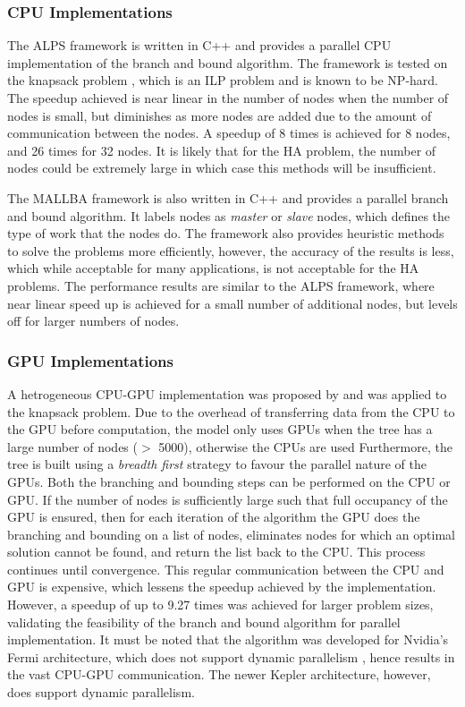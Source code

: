\documentclass[10pt,twocolumn]{witseiepaper}
\begin{document}
\subsubsection{ CPU Implementations } \label{ssec:cpuimp}

The ALPS framework \cite{xu:2005} is written in C++ and provides a parallel CPU implementation of the branch
and bound algorithm. The framework is tested on the knapsack problem \cite{kedia:2005}, which is an ILP problem 
and is known to be NP-hard. The speedup achieved is near linear in the number of nodes when the number of 
nodes is small, but diminishes as more nodes are added due to the amount of communication between the nodes. 
A speedup of 8 times is achieved for 8 nodes, and 26 times for 32 nodes. It is likely that for the HA problem, 
the number of nodes could be extremely large in which case this methods will be insufficient. 

The MALLBA framework \cite{alba:2002} is also written in C++ and provides a parallel branch and bound
algorithm. It labels nodes as \textit{master} or \textit{slave} nodes, which defines the type of work that the
nodes do. The framework also provides heuristic methods to solve the problems more efficiently, however, the
accuracy of the results is less, which while acceptable for many applications, is not acceptable for the HA
problems. The performance results are similar to the ALPS framework, where near linear speed up is achieved for
a small number of additional nodes, but levels off for larger numbers of nodes.

\subsubsection{ GPU Implementations } \label{ssec:gpuimp}

A hetrogeneous CPU-GPU implementation was proposed by \cite{bouk:2012} and was applied to the knapsack 
problem. Due to the overhead of transferring data from the CPU to the GPU before computation, the model only 
uses GPUs when the tree has a large number of nodes ($>$ 5000), otherwise the CPUs are used Furthermore, the 
tree is built using a \textit{breadth first} strategy to favour the parallel nature of the GPUs. Both the
branching and bounding steps can be performed on the CPU or GPU. If the number of nodes is sufficiently large
such that full occupancy of the GPU is ensured, then for each iteration of the algorithm the GPU does the
branching and bounding on a list of nodes, eliminates nodes for which an optimal solution cannot be found, and
return the list back to the CPU. This process continues until convergence. This regular communication between
the CPU and GPU is expensive, which lessens the speedup achieved by the implementation. However, a speedup of 
up to 9.27 times was achieved for larger problem sizes, validating the feasibility of the branch and bound 
algorithm for parallel implementation. It must be noted that the algorithm was developed for Nvidia's Fermi
architecture, which does not support dynamic parallelism \cite{nvidia:2012}, hence results in the vast CPU-GPU 
communication. The newer Kepler architecture, however, does support dynamic parallelism. 
\end{document}
